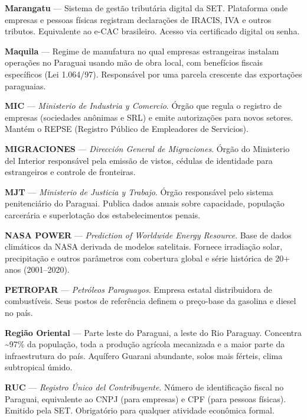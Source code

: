 \medskip
\noindent\textbf{Marangatu} — Sistema de gestão tributária digital da SET. Plataforma onde empresas e pessoas físicas registram declarações de IRACIS, IVA e outros tributos. Equivalente ao e-CAC brasileiro. Acesso via certificado digital ou senha.

\medskip
\noindent\textbf{Maquila} — Regime de manufatura no qual empresas estrangeiras instalam operações no Paraguai usando mão de obra local, com benefícios fiscais específicos (Lei 1.064/97). Responsável por uma parcela crescente das exportações paraguaias.

\medskip
\noindent\textbf{MIC} — \textit{Ministerio de Industria y Comercio}. Órgão que regula o registro de empresas (sociedades anônimas e SRL) e emite autorizações para novos setores. Mantém o REPSE (Registro Público de Empleadores de Servicios).

\medskip
\noindent\textbf{MIGRACIONES} — \textit{Dirección General de Migraciones}. Órgão do Ministerio del Interior responsável pela emissão de vistos, cédulas de identidade para estrangeiros e controle de fronteiras.

\medskip
\noindent\textbf{MJT} — \textit{Ministerio de Justicia y Trabajo}. Órgão responsável pelo sistema penitenciário do Paraguai. Publica dados anuais sobre capacidade, população carcerária e superlotação dos estabelecimentos penais.

\medskip
\noindent\textbf{NASA POWER} — \textit{Prediction of Worldwide Energy Resource}. Base de dados climáticos da NASA derivada de modelos satelitais. Fornece irradiação solar, precipitação e outros parâmetros com cobertura global e série histórica de 20+ anos (2001--2020).

\medskip
\noindent\textbf{PETROPAR} — \textit{Petróleos Paraguayos}. Empresa estatal distribuidora de combustíveis. Seus postos de referência definem o preço-base da gasolina e diesel no país.

\medskip
\noindent\textbf{Região Oriental} — Parte leste do Paraguai, a leste do Rio Paraguay. Concentra \textasciitilde{}97\% da população, toda a produção agrícola mecanizada e a maior parte da infraestrutura do país. Aquífero Guarani abundante, solos mais férteis, clima subtropical úmido.

\medskip
\noindent\textbf{RUC} — \textit{Registro Único del Contribuyente}. Número de identificação fiscal no Paraguai, equivalente ao CNPJ (para empresas) e CPF (para pessoas físicas). Emitido pela SET. Obrigatório para qualquer atividade econômica formal.

